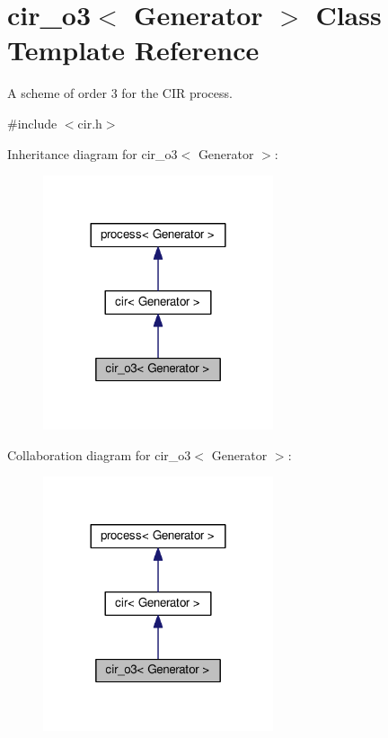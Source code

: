 \hypertarget{classcir__o3}{}\section{cir\+\_\+o3$<$ Generator $>$ Class Template Reference}
\label{classcir__o3}


A scheme of order 3 for the C\+IR process.  




{\ttfamily \#include $<$cir.\+h$>$}



Inheritance diagram for cir\+\_\+o3$<$ Generator $>$\+:\nopagebreak
\begin{figure}[H]
\begin{center}
\leavevmode
\includegraphics[width=192pt]{classcir__o3__inherit__graph}
\end{center}
\end{figure}


Collaboration diagram for cir\+\_\+o3$<$ Generator $>$\+:\nopagebreak
\begin{figure}[H]
\begin{center}
\leavevmode
\includegraphics[width=192pt]{classcir__o3__coll__graph}
\end{center}
\end{figure}
